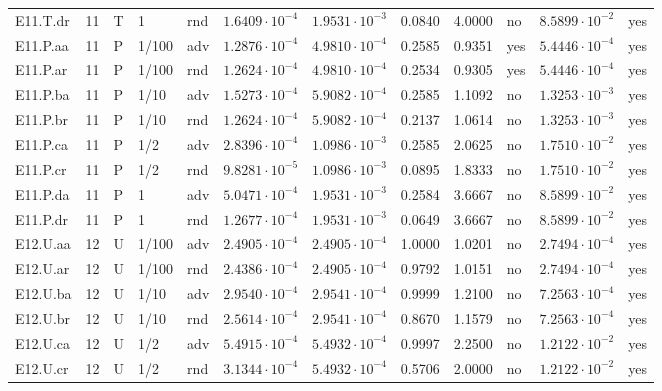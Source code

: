 {\begin{longtable}{@{}lllllllllll l@{}}
E11.T.dr & 11 & T & 1 & rnd & $1.6409\cdot 10^{-4}$ & $1.9531\cdot 10^{-3}$ & 0.0840 & 4.0000 & no & $8.5899\cdot 10^{-2}$ & yes \\
E11.P.aa & 11 & P & 1/100 & adv & $1.2876\cdot 10^{-4}$ & $4.9810\cdot 10^{-4}$ & 0.2585 & 0.9351 & yes & $5.4446\cdot 10^{-4}$ & yes \\
E11.P.ar & 11 & P & 1/100 & rnd & $1.2624\cdot 10^{-4}$ & $4.9810\cdot 10^{-4}$ & 0.2534 & 0.9305 & yes & $5.4446\cdot 10^{-4}$ & yes \\
E11.P.ba & 11 & P & 1/10 & adv & $1.5273\cdot 10^{-4}$ & $5.9082\cdot 10^{-4}$ & 0.2585 & 1.1092 & no & $1.3253\cdot 10^{-3}$ & yes \\
E11.P.br & 11 & P & 1/10 & rnd & $1.2624\cdot 10^{-4}$ & $5.9082\cdot 10^{-4}$ & 0.2137 & 1.0614 & no & $1.3253\cdot 10^{-3}$ & yes \\
E11.P.ca & 11 & P & 1/2 & adv & $2.8396\cdot 10^{-4}$ & $1.0986\cdot 10^{-3}$ & 0.2585 & 2.0625 & no & $1.7510\cdot 10^{-2}$ & yes \\
E11.P.cr & 11 & P & 1/2 & rnd & $9.8281\cdot 10^{-5}$ & $1.0986\cdot 10^{-3}$ & 0.0895 & 1.8333 & no & $1.7510\cdot 10^{-2}$ & yes \\
E11.P.da & 11 & P & 1 & adv & $5.0471\cdot 10^{-4}$ & $1.9531\cdot 10^{-3}$ & 0.2584 & 3.6667 & no & $8.5899\cdot 10^{-2}$ & yes \\
E11.P.dr & 11 & P & 1 & rnd & $1.2677\cdot 10^{-4}$ & $1.9531\cdot 10^{-3}$ & 0.0649 & 3.6667 & no & $8.5899\cdot 10^{-2}$ & yes \\
E12.U.aa & 12 & U & 1/100 & adv & $2.4905\cdot 10^{-4}$ & $2.4905\cdot 10^{-4}$ & 1.0000 & 1.0201 & no & $2.7494\cdot 10^{-4}$ & yes \\
E12.U.ar & 12 & U & 1/100 & rnd & $2.4386\cdot 10^{-4}$ & $2.4905\cdot 10^{-4}$ & 0.9792 & 1.0151 & no & $2.7494\cdot 10^{-4}$ & yes \\
E12.U.ba & 12 & U & 1/10 & adv & $2.9540\cdot 10^{-4}$ & $2.9541\cdot 10^{-4}$ & 0.9999 & 1.2100 & no & $7.2563\cdot 10^{-4}$ & yes \\
E12.U.br & 12 & U & 1/10 & rnd & $2.5614\cdot 10^{-4}$ & $2.9541\cdot 10^{-4}$ & 0.8670 & 1.1579 & no & $7.2563\cdot 10^{-4}$ & yes \\
E12.U.ca & 12 & U & 1/2 & adv & $5.4915\cdot 10^{-4}$ & $5.4932\cdot 10^{-4}$ & 0.9997 & 2.2500 & no & $1.2122\cdot 10^{-2}$ & yes \\
E12.U.cr & 12 & U & 1/2 & rnd & $3.1344\cdot 10^{-4}$ & $5.4932\cdot 10^{-4}$ & 0.5706 & 2.0000 & no & $1.2122\cdot 10^{-2}$ & yes \\

\end{longtable}}
